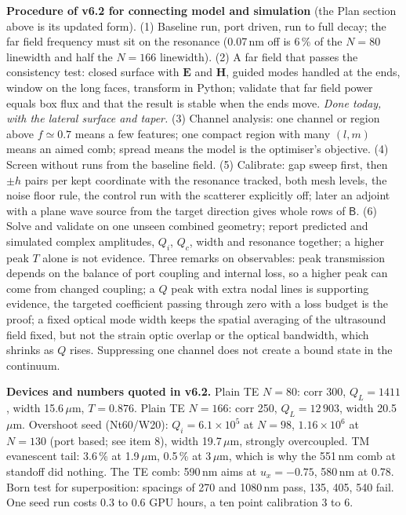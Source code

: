 \documentclass[11pt,a4paper]{article}
\begin{document}
\textbf{Procedure of v6.2 for connecting model and simulation} (the Plan section above is its updated form).
(1) Baseline run, port driven, run to full decay; the far field frequency must sit on the resonance (0.07\,nm off
is 6\,\% of the $N=80$ linewidth and half the $N=166$ linewidth). (2) A far field that passes the consistency
test: closed surface with $\mathbf E$ and $\mathbf H$, guided modes handled at the ends, window on the long
faces, transform in Python; validate that far field power equals box flux and that the result is stable when the
ends move. \emph{Done today, with the lateral surface and taper.} (3) Channel analysis: one channel or region
above $f\simeq0.7$ means a few features; one compact region with many $(l,m)$ means an aimed comb; spread means
the model is the optimiser's objective. (4) Screen without runs from the baseline field. (5) Calibrate: gap
sweep first, then $\pm h$ pairs per kept coordinate with the resonance tracked, both mesh levels, the noise
floor rule, the control run with the scatterer explicitly off; later an adjoint with a plane wave source from
the target direction gives whole rows of $\mathsf B$. (6) Solve and validate on one unseen combined geometry;
report predicted and simulated complex amplitudes, $Q_i$, $Q_c$, width and resonance together; a higher peak $T$
alone is not evidence. Three remarks on observables: peak transmission depends on the balance of port coupling
and internal loss, so a higher peak can come from changed coupling; a $Q$ peak with extra nodal lines is
supporting evidence, the targeted coefficient passing through zero with a loss budget is the proof; a fixed
optical mode width keeps the spatial averaging of the ultrasound field fixed, but not the strain optic overlap or
the optical bandwidth, which shrinks as $Q$ rises. Suppressing one channel does not create a bound state in the
continuum.

\textbf{Devices and numbers quoted in v6.2.} Plain TE $N=80$: corr 300, $Q_L=1411$, width 15.6\,$\mu$m,
$T=0.876$. Plain TE $N=166$: corr 250, $Q_L=12\,903$, width 20.5\,$\mu$m. Overshoot seed (Nt60/W20):
$Q_i=6.1\times10^5$ at $N=98$, $1.16\times10^6$ at $N=130$ (port based; see item 8), width 19.7\,$\mu$m, strongly
overcoupled. TM evanescent tail: 3.6\,\% at 1.9\,$\mu$m, 0.5\,\% at 3\,$\mu$m, which is why the 551\,nm comb at
standoff did nothing. The TE comb: 590\,nm aims at $u_x=-0.75$, 580\,nm at 0.78. Born test for superposition:
spacings of 270 and 1080\,nm pass, 135, 405, 540 fail. One seed run costs 0.3 to 0.6 GPU hours, a ten point
calibration 3 to 6.
\end{document}
